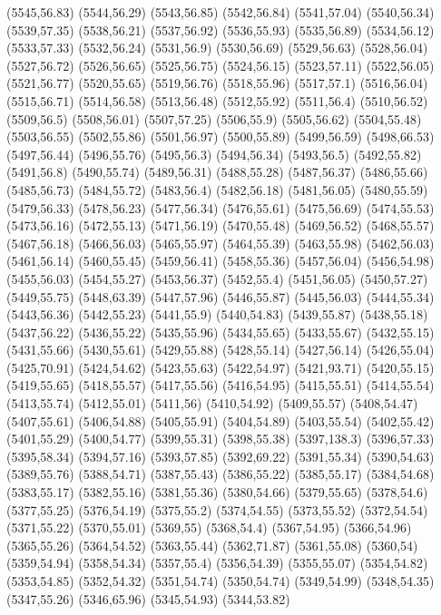 (5545,56.83)
(5544,56.29)
(5543,56.85)
(5542,56.84)
(5541,57.04)
(5540,56.34)
(5539,57.35)
(5538,56.21)
(5537,56.92)
(5536,55.93)
(5535,56.89)
(5534,56.12)
(5533,57.33)
(5532,56.24)
(5531,56.9)
(5530,56.69)
(5529,56.63)
(5528,56.04)
(5527,56.72)
(5526,56.65)
(5525,56.75)
(5524,56.15)
(5523,57.11)
(5522,56.05)
(5521,56.77)
(5520,55.65)
(5519,56.76)
(5518,55.96)
(5517,57.1)
(5516,56.04)
(5515,56.71)
(5514,56.58)
(5513,56.48)
(5512,55.92)
(5511,56.4)
(5510,56.52)
(5509,56.5)
(5508,56.01)
(5507,57.25)
(5506,55.9)
(5505,56.62)
(5504,55.48)
(5503,56.55)
(5502,55.86)
(5501,56.97)
(5500,55.89)
(5499,56.59)
(5498,66.53)
(5497,56.44)
(5496,55.76)
(5495,56.3)
(5494,56.34)
(5493,56.5)
(5492,55.82)
(5491,56.8)
(5490,55.74)
(5489,56.31)
(5488,55.28)
(5487,56.37)
(5486,55.66)
(5485,56.73)
(5484,55.72)
(5483,56.4)
(5482,56.18)
(5481,56.05)
(5480,55.59)
(5479,56.33)
(5478,56.23)
(5477,56.34)
(5476,55.61)
(5475,56.69)
(5474,55.53)
(5473,56.16)
(5472,55.13)
(5471,56.19)
(5470,55.48)
(5469,56.52)
(5468,55.57)
(5467,56.18)
(5466,56.03)
(5465,55.97)
(5464,55.39)
(5463,55.98)
(5462,56.03)
(5461,56.14)
(5460,55.45)
(5459,56.41)
(5458,55.36)
(5457,56.04)
(5456,54.98)
(5455,56.03)
(5454,55.27)
(5453,56.37)
(5452,55.4)
(5451,56.05)
(5450,57.27)
(5449,55.75)
(5448,63.39)
(5447,57.96)
(5446,55.87)
(5445,56.03)
(5444,55.34)
(5443,56.36)
(5442,55.23)
(5441,55.9)
(5440,54.83)
(5439,55.87)
(5438,55.18)
(5437,56.22)
(5436,55.22)
(5435,55.96)
(5434,55.65)
(5433,55.67)
(5432,55.15)
(5431,55.66)
(5430,55.61)
(5429,55.88)
(5428,55.14)
(5427,56.14)
(5426,55.04)
(5425,70.91)
(5424,54.62)
(5423,55.63)
(5422,54.97)
(5421,93.71)
(5420,55.15)
(5419,55.65)
(5418,55.57)
(5417,55.56)
(5416,54.95)
(5415,55.51)
(5414,55.54)
(5413,55.74)
(5412,55.01)
(5411,56)
(5410,54.92)
(5409,55.57)
(5408,54.47)
(5407,55.61)
(5406,54.88)
(5405,55.91)
(5404,54.89)
(5403,55.54)
(5402,55.42)
(5401,55.29)
(5400,54.77)
(5399,55.31)
(5398,55.38)
(5397,138.3)
(5396,57.33)
(5395,58.34)
(5394,57.16)
(5393,57.85)
(5392,69.22)
(5391,55.34)
(5390,54.63)
(5389,55.76)
(5388,54.71)
(5387,55.43)
(5386,55.22)
(5385,55.17)
(5384,54.68)
(5383,55.17)
(5382,55.16)
(5381,55.36)
(5380,54.66)
(5379,55.65)
(5378,54.6)
(5377,55.25)
(5376,54.19)
(5375,55.2)
(5374,54.55)
(5373,55.52)
(5372,54.54)
(5371,55.22)
(5370,55.01)
(5369,55)
(5368,54.4)
(5367,54.95)
(5366,54.96)
(5365,55.26)
(5364,54.52)
(5363,55.44)
(5362,71.87)
(5361,55.08)
(5360,54)
(5359,54.94)
(5358,54.34)
(5357,55.4)
(5356,54.39)
(5355,55.07)
(5354,54.82)
(5353,54.85)
(5352,54.32)
(5351,54.74)
(5350,54.74)
(5349,54.99)
(5348,54.35)
(5347,55.26)
(5346,65.96)
(5345,54.93)
(5344,53.82)
